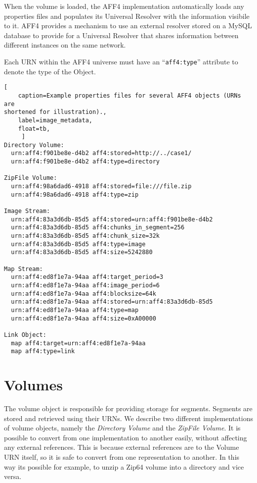 \documentclass[10pt, conference]{IEEEtran}
\begin{document}
When the volume is loaded, the AFF4 implementation automatically loads
any properties files and populates its Universal Resolver with the
information visibile to it. AFF4 provides a mechanism to use an
external resolver stored on a MySQL database to provide for a
Universal Resolver that shares information between different instances
on the same network.

Each URN within the AFF4 universe must have an ``\texttt{aff4:type}''
attribute to denote the type of the Object.

\begin{lstlisting}[
	caption=Example properties files for several AFF4 objects (URNs are
shortened for illustration).,
	label=image_metadata,
	float=tb,
	 ]
Directory Volume:
  urn:aff4:f901be8e-d4b2 aff4:stored=http://../case1/
  urn:aff4:f901be8e-d4b2 aff4:type=directory

ZipFile Volume:
  urn:aff4:98a6dad6-4918 aff4:stored=file:///file.zip
  urn:aff4:98a6dad6-4918 aff4:type=zip

Image Stream:
  urn:aff4:83a3d6db-85d5 aff4:stored=urn:aff4:f901be8e-d4b2
  urn:aff4:83a3d6db-85d5 aff4:chunks_in_segment=256
  urn:aff4:83a3d6db-85d5 aff4:chunk_size=32k
  urn:aff4:83a3d6db-85d5 aff4:type=image
  urn:aff4:83a3d6db-85d5 aff4:size=5242880

Map Stream:
  urn:aff4:ed8f1e7a-94aa aff4:target_period=3
  urn:aff4:ed8f1e7a-94aa aff4:image_period=6
  urn:aff4:ed8f1e7a-94aa aff4:blocksize=64k
  urn:aff4:ed8f1e7a-94aa aff4:stored=urn:aff4:83a3d6db-85d5
  urn:aff4:ed8f1e7a-94aa aff4:type=map
  urn:aff4:ed8f1e7a-94aa aff4:size=0xA00000

Link Object:
  map aff4:target=urn:aff4:ed8f1e7a-94aa
  map aff4:type=link
\end{lstlisting}

\section{Volumes}
The volume object is responsible for providing storage for
segments. Segments are stored and retrieved using their URNs. We
describe two different implementations of volume objects, namely the
{\em Directory Volume} and the {\em ZipFile Volume}. It is possible to
convert from one implementation to another easily, without affecting
any external references. This is because external references are to
the Volume URN itself, so it is safe to convert from one
representation to another. In this way its possible for example, to
unzip a Zip64 volume into a directory and vice versa.
\end{document}
